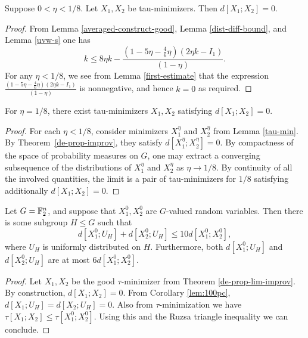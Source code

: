 \begin{theorem}\label{de-prop-improv}\leanok
Suppose $0 < \eta < 1/8$.  Let $X_1, X_2$ be tau-minimizers.  Then $d[X_1;X_2] = 0$.
\end{theorem}

\begin{proof}\leanok
From Lemma \ref{averaged-construct-good}, Lemma \ref{dist-diff-bound}, and Lemma \ref{uvw-s} one has
  \[ k \leq 8\eta k - \frac{(1 -5 \eta - \frac{4}{6} \eta)(2 \eta k - I_1)}{(1-\eta)}.\]
  For any $\eta < 1/8$, we see from Lemma \ref{first-estimate} that the expression $\frac{(1 -5 \eta - \frac{4}{6} \eta)(2 \eta k - I_1)}{(1-\eta)}$ is nonnegative, and hence $k = 0$ as required.
\end{proof}


\begin{theorem}\label{de-prop-lim-improv}\leanok
For $\eta = 1/8$, there exist tau-minimizers $X_1, X_2$ satisfying $d[X_1;X_2] = 0$.
\end{theorem}
\begin{proof}\leanok
For each $\eta<1/8$, consider minimizers $X_1^\eta$ and $X_2^\eta$ from Lemma \ref{tau-min}.
By Theorem~\ref{de-prop-improv},
they satisfy $d[X_1^\eta; X_2^\eta]=0$. By compactness of the space of probability measures
on $G$, one may extract a converging subsequence of the distributions of $X_1^\eta$ and $X_2^\eta$
as $\eta \to 1/8$. By continuity of all the involved quantities, the limit is a pair of
tau-minimizers for $1/8$ satisfying additionally $d[X_1;X_2] = 0$.
\end{proof}

\begin{theorem}\label{entropy-pfr-improv}\leanok
  Let $G = \mathbb{F}_2^n$, and suppose that $X^0_1, X^0_2$ are $G$-valued random variables.
  Then there is some subgroup $H \leq G$ such that
  \[
    d[X^0_1;U_H] + d[X^0_2;U_H] \le 10 d[X^0_1;X^0_2],
  \]
  where $U_H$ is uniformly distributed on $H$.
  Furthermore, both $d[X^0_1;U_H]$ and $d[X^0_2;U_H]$ are at most $6 d[X^0_1;X^0_2]$.
\end{theorem}

\begin{proof} \leanok
Let $X_1, X_2$ be the good $\tau$-minimizer from Theorem \ref{de-prop-lim-improv}. By construction, $d[X_1;X_2]=0$.
From Corollary \ref{lem:100pc}, $d[X_1;U_H] = d[X_2; U_H] = 0$.  Also from $\tau$-minimization we have $\tau[X_1;X_2] \leq \tau[X^0_1;X^0_2]$.  Using this and the Ruzsa triangle inequality we can conclude.
\end{proof}

